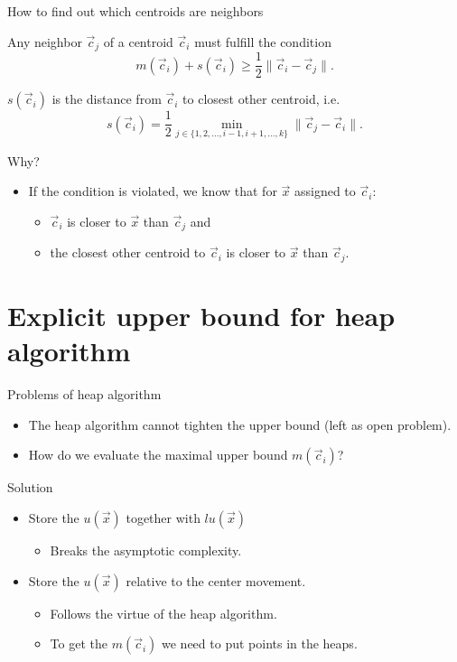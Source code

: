 \documentclass[10pt, compress]{beamer}
\newcommand{\x}{\vec{x}}
\newcommand{\cj}{\vec{c}_j}
\newcommand{\ci}{\vec{c}_i}
\newcommand{\ux}{u(\x)}
\newcommand{\sci}{s(\ci)}
\newcommand{\lux}{lu(\x)}
\newcommand{\mci}{m(\ci)}
\begin{document}
\begin{frame}{How to find out which centroids are neighbors}
  \begin{theorem}
    Any neighbor $\cj$ of a centroid $\ci$ must fulfill the condition
    \begin{equation}
      m(\ci) + s(\ci) \geq \frac{1}{2} \| \ci - \cj \|.
    \end{equation}
  \end{theorem}
  $\sci$ is the distance from $\ci$ to closest other centroid, i.e.
  \begin{equation}
    \sci = \frac{1}{2} \min_{j \in \{1,2, \ldots, i-1, i+1, \ldots, k\}} \| \cj - \ci \|.
  \end{equation}
\end{frame}

\begin{frame}{Why?}
  \begin{itemize}
    \item If the condition is violated, we know that for $\x$ assigned to $\ci$:
    \begin{itemize}
      \item $\ci$ is closer to $\x$ than $\cj$ and
      \item the closest other centroid to $\ci$ is closer to $\x$ than $\cj$.
    \end{itemize}
  \end{itemize}
\end{frame}

\section{Explicit upper bound for heap algorithm}

\begin{frame}{Problems of heap algorithm}
  \begin{itemize}
    \item The heap algorithm cannot tighten the upper bound (left as open problem).
    \item How do we evaluate the maximal upper bound $\mci$?
  \end{itemize}
\end{frame}

\begin{frame}{Solution}
  \begin{itemize}
    \item[\no] Store the $\ux$ together with $\lux$
    \begin{itemize}
      \item Breaks the asymptotic complexity.
    \end{itemize}
    \item[\yes] Store the $\ux$ relative to the center movement.
    \begin{itemize}
      \item Follows the virtue of the heap algorithm.
      \item To get the $\mci$ we need to put points in the heaps.
    \end{itemize}
  \end{itemize}
\end{frame}
\end{document}
